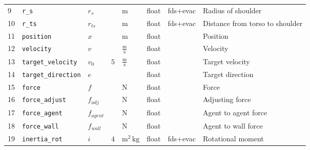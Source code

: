 \begin{tabularx}{1.0\linewidth}{llllllll}
9  &                      \verb|r_s| &          $r_{s}$ &                                     &                 $\mathrm{m}$ &       float &   fds+evac &                                 Radius of shoulder \\
10 &                     \verb|r_ts| &         $r_{ts}$ &                                     &                 $\mathrm{m}$ &       float &   fds+evac &                    Distance from torso to shoulder \\
11 &                 \verb|position| &              $x$ &                                     &                 $\mathrm{m}$ &       float &            &                                           Position \\
12 &                 \verb|velocity| &              $v$ &                                     &       $\mathrm{\frac{m}{s}}$ &       float &            &                                           Velocity \\
13 &          \verb|target_velocity| &          $v_{0}$ &                                 $5$ &       $\mathrm{\frac{m}{s}}$ &       float &            &                                    Target velocity \\
14 &         \verb|target_direction| &              $e$ &                                     &                              &       float &            &                                   Target direction \\
15 &                    \verb|force| &              $f$ &                                     &                 $\mathrm{N}$ &       float &            &                                              Force \\
16 &             \verb|force_adjust| &        $f_{adj}$ &                                     &                 $\mathrm{N}$ &       float &            &                                    Adjusting force \\
17 &              \verb|force_agent| &      $f_{agent}$ &                                     &                 $\mathrm{N}$ &       float &            &                               Agent to agent force \\
18 &               \verb|force_wall| &       $f_{wall}$ &                                     &                 $\mathrm{N}$ &       float &            &                                Agent to wall force \\
19 &              \verb|inertia_rot| &              $i$ &                                 $4$ &         $\mathrm{m^{2}\,kg}$ &       float &   fds+evac &                                  Rotational moment \\

\end{tabularx}
